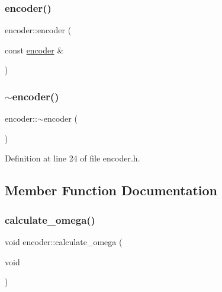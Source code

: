 \subsubsection{\texorpdfstring{encoder()}{encoder()}\hspace{0.1cm}{\footnotesize\ttfamily [4/4]}}
{\footnotesize\ttfamily encoder\+::encoder (\begin{DoxyParamCaption}\item[{const \mbox{\hyperlink{classencoder}{encoder}} \&}]{ }\end{DoxyParamCaption})\hspace{0.3cm}{\ttfamily [default]}}

\mbox{\label{classencoder_aa3b6033758cc93ea194c4b635c9547d6}} 
\subsubsection{\texorpdfstring{$\sim$encoder()}{~encoder()}}
{\footnotesize\ttfamily encoder\+::$\sim$encoder (\begin{DoxyParamCaption}{ }\end{DoxyParamCaption})\hspace{0.3cm}{\ttfamily [inline]}}



Definition at line 24 of file encoder.\+h.



\subsection{Member Function Documentation}
\mbox{\label{classencoder_a8e8856a7fba7d2d7d11c1a1b2428b246}} 
\subsubsection{\texorpdfstring{calculate\_omega()}{calculate\_omega()}}
{\footnotesize\ttfamily void encoder\+::calculate\+\_\+omega (\begin{DoxyParamCaption}\item[{void}]{ }\end{DoxyParamCaption})}



